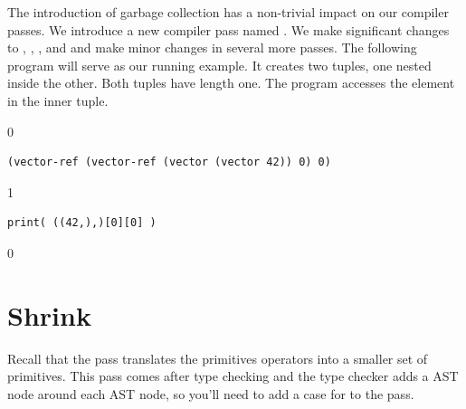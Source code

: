 \documentclass[7x10,nocrop]{TimesAPriori_MIT}%
\def\racketEd{0}
\def\pythonEd{1}
\def\edition{0}
\newtheorem{exercise}[theorem]{Exercise}
\begin{document}

The introduction of garbage collection has a non-trivial impact on our
compiler passes. We introduce a new compiler pass named
. We make significant changes to
, ,
, and  and
make minor changes in several more passes.  The following program will
serve as our running example.  It creates two tuples, one nested
inside the other. Both tuples have length one. The program accesses
the element in the inner tuple.
{\if\edition\racketEd
\begin{lstlisting}
(vector-ref (vector-ref (vector (vector 42)) 0) 0)
\end{lstlisting}
\fi}
{\if\edition\pythonEd
\begin{lstlisting}
print( ((42,),)[0][0] )
\end{lstlisting}
\fi}


{\if\edition\racketEd
\section{Shrink}
\label{sec:shrink-Lvec}

Recall that the  pass translates the primitives operators
into a smaller set of primitives.
%
This pass comes after type checking and the type checker adds a
 AST node around each  AST node, so you'll
need to add a case for  to the  pass.

\fi}
\end{document}
